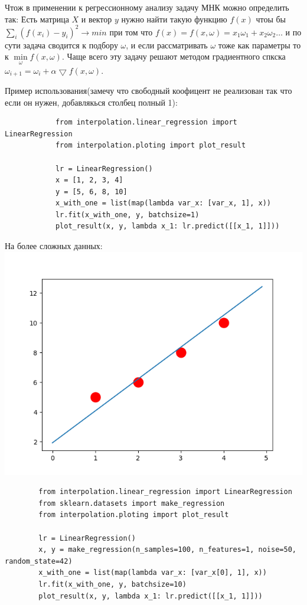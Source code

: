 \documentclass[12pt]{article} %
\begin{document}
 		Чтож в применении к регрессионному анализу задачу МНК можно определить так:
 		Есть матрица $X$ и вектор $y$ нужно найти такую функцию $f(x)$ чтоы бы $\sum_i (f(x_i) - y_i)^2 \to min$ при том что $f(x) = f(x, \omega) = x_1 \omega_1 + x_2 \omega_2 \dots $ и по сути задача сводится к подбору $\omega$, и если рассматривать $\omega$ тоже как параметры то к $\min\limits_{ \omega} f(x, \omega)$. Чаще всего эту задачу решают методом градиентного спкска $\omega_{i + 1} = \omega_i + \alpha \bigtriangledown f(x, \omega)$.
 		
 		Пример использования(замечу что свободный коофицент не реализован так что если он нужен, добавлякься столбец полный 1):
 		\begin{verbatim}
 			from interpolation.linear_regression import LinearRegression
 			from interpolation.ploting import plot_result
 			
	 		lr = LinearRegression()
	 		x = [1, 2, 3, 4]
	 		y = [5, 6, 8, 10]
	 		x_with_one = list(map(lambda var_x: [var_x, 1], x))
	 		lr.fit(x_with_one, y, batchsize=1)
	 		plot_result(x, y, lambda x_1: lr.predict([[x_1, 1]]))
 		\end{verbatim}
 	На более сложных данных:
 	\includegraphics{6}
 	\begin{verbatim}
 		from interpolation.linear_regression import LinearRegression
 		from sklearn.datasets import make_regression
 		from interpolation.ploting import plot_result
 		
 		lr = LinearRegression()
 		x, y = make_regression(n_samples=100, n_features=1, noise=50, random_state=42)
 		x_with_one = list(map(lambda var_x: [var_x[0], 1], x))
 		lr.fit(x_with_one, y, batchsize=10)
 		plot_result(x, y, lambda x_1: lr.predict([[x_1, 1]]))
 	\end{verbatim}
\end{document}
